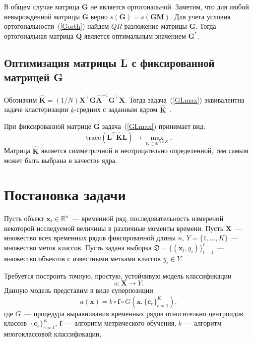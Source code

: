 В общем случае матрица $\mathbf{G}$ не является ортогональной.
Заметим, что для любой невырожденной матрицы $\mathbf{G}$ верно $s(\mathbf{G}) = s(\mathbf{G M})$.
Для учета условия ортогональности~(\ref{Gorth}) найдем $QR$-разложение матрицы $\mathbf{G}$.
Тогда ортогональная матрица $\mathbf{Q}$ является оптимальным значением $\mathbf{G}^*$.

\subsection{Оптимизация матрицы L с фиксированной матрицей G}
\begin{theorem}
	Обозначим $\hat{\mathbf{K}} = (1/N)\mathbf{X}^{\top} \mathbf{G} \hat{\mathbf{A}}^{-1} \mathbf{G}^{\top} \mathbf{X}$.
	Тогда задача~(\ref{GLmax}) эквивалентна задаче кластеризации $k$-средних с заданным ядром $\hat{\mathbf{K}}$~\cite{shawe2004kernel}.
\end{theorem}

При фиксированной матрице $\mathbf{G}$ задача~(\ref{GLmax}) принимает вид:
\begin{equation*}
\text{trace} (\mathbf{L}^{\top} \hat{\mathbf{K}} \mathbf{L}) \to \max_{\mathbf{L} \in \mathbb{R}^{N \times K}}.
\end{equation*}
Матрица $\hat{\mathbf{K}}$ является симметричной и неотрицательно определенной, тем самым может быть выбрана в качестве ядра.



\section{Постановка задачи}
Пусть объект $\mathbf{x}_i \in \mathbb{R}^n$~--- временной ряд, последовательность измерений некоторой исследуемой величины в различные моменты времени.
Пусть $\mathbf{X}$~--- множество всех временных рядов фиксированной длины $n$, $Y = \{1, \dots, K\}$~--- множество меток классов.
Пусть задана выборка $\mathfrak{D} = \{(\mathbf{x}_i, y_i)\}_{i=1}^\ell$~--- множество объектов с известными метками классов $y_i \in Y$.

Требуется построить точную, простую, устойчивую модель классификации
\[
a: \mathbf{X} \to Y.
\]
Данную модель представим в виде суперпозиции
\begin{equation}
\label{eq:classifiers}
a(\mathbf{x}) = b \circ \mathbf{f} \circ G(\mathbf{x}, \{\mathbf{c}_e\}_{e = 1} ^ K),
\end{equation}
где $G$~--- процедура выравнивания временных рядов относительно центроидов классов~$\{\mathbf{c}_e\}_{e = 1} ^ K$, $\mathbf{f}$~--- алгоритм метрического обучения, $b$~--- алгоритм многоклассовой классификации.

